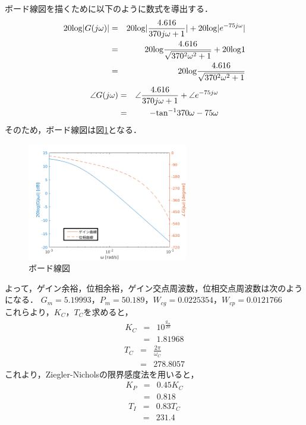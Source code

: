 \documentclass[12pt]{jsarticle}
\begin{document}
ボード線図を描くために以下のように数式を導出する．
\setcounter{page}{1}
\begin{eqnarray}
  20{\rm log}|G(j\omega)| &=& 20{\rm log}|\frac{4.616}{370j\omega+1}| + 20{\rm log}|e^{-75j\omega}| \\ \nonumber
  &=& 20{\rm log}\frac{4.616}{\sqrt{370^2\omega^2+1}} + 20{\rm log}1 \\ \nonumber
  &=& 20{\rm log}\frac{4.616}{\sqrt{370^2\omega^2+1}} \nonumber
\end{eqnarray}
\begin{eqnarray}
  \angle G(j\omega) &=& \angle \frac{4.616}{370j\omega+1} + \angle e^{-75j\omega} \\
  &=& -{\rm tan}^{-1}370\omega - 75\omega
\end{eqnarray}
そのため，ボード線図は図\ref{BodeDiagram}となる．

\begin{figure}[tb]
  \begin{center}
    \includegraphics[clip,width=7.0cm]{../graph/BodeDiagram.png}
    \caption{ボード線図}
    \label{BodeDiagram}
  \end{center}
\end{figure}

よって，ゲイン余裕，位相余裕，ゲイン交点周波数，位相交点周波数は次のようになる．
$G_m=5.19993$，$P_m=50.189$，$W_{cg}=0.0225354$，$W_{cp}=0.0121766$ \\
これらより，$K_C$，$T_C$を求めると，
\begin{eqnarray}
  \label{}
  K_C &=& 10^{\frac{g_m}{20}} \\
  &=& 1.81968
\end{eqnarray}
\begin{eqnarray}
  \label{}
  T_C &=& \frac{2\pi}{\omega_C} \\
  &=& 278.8057
\end{eqnarray}
これより，Ziegler-Nicholsの限界感度法を用いると，
\begin{eqnarray}
  \label{}
  K_P &=& 0.45 K_C \\
  &=& 0.818
\end{eqnarray}
\begin{eqnarray}
  T_I &=& 0.83 T_C \\
  &=& 231.4
\end{eqnarray}
\end{document}
